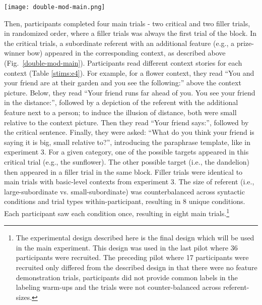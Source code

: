 \begin{figure*}[t]
	\begin{center}
		\texttt{[image: double-mod-main.png]}
	\end{center}
	\vspace{-0.3cm}
	\caption{Experiment 4 main trial.}
	\label{double-mod-main}
\end{figure*} 
Then, participants completed four main trials - two critical and two filler trials, in randomized order, where a filler trials was always the first trial of the block. In the critical trials, a subordinate referent with an additional feature (e.g., a prize-winner bow) appeared in the corresponding context, as described above (Fig.~\ref{double-mod-main}). Participants read different context stories for each context (Table \ref{stims:e4}).  For example, for a flower context, they read “You and your friend are at their garden and you see the following:” above the context picture. Below, they read “Your friend runs far ahead of you. You see your friend in the distance:”, followed by a depiction of the referent with the additional feature next to a person; to induce the illusion of distance, both were small relative to the context picture. Then they read “Your friend says:”, followed by the critical sentence. Finally, they were asked: “What do you think your friend is saying it is {big, small} relative to?”, introducing the paraphrase template, like in experiment 3. For a given category, one of the possible targets appeared in this critical trial (e.g., the sunflower). The other possible target (i.e., the dandelion) then appeared in a filler trial in the same block. Filler trials were identical to main trials with basic-level contexts from experiment 3. The size of referent (i.e., large-subordinate vs. small-subordinate) was counterbalanced across syntactic conditions and trial types within-participant, resulting in 8 unique conditions. Each participant saw each condition once, resulting in eight main trials.\footnote{The experimental design described here is the final design which will be used in the main experiment. This design was used in the last pilot where 36 participants were recruited. The preceding pilot where 17 participants were recruited only differed from the described design in that there were no feature demonstration trials, participants did not provide common labels in the labeling warm-ups and the trials were not counter-balanced across referent-sizes.}


